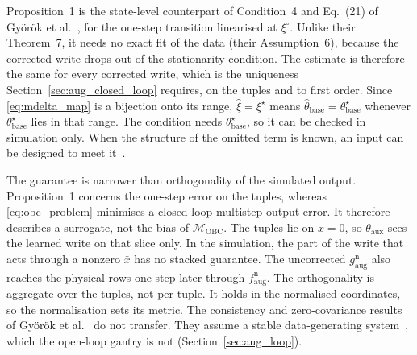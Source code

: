 Proposition~1 is the state-level counterpart of Condition~4 and Eq.~(21) of
Gy\"or\"ok et al.~\cite[Sec.~4.1]{gyorok2026obc}, for the one-step transition
linearised at $\xi^\circ$.
Unlike their Theorem~7, it needs no exact fit of the data (their
Assumption~6), because the corrected write drops out of the stationarity
condition.
The estimate is therefore the same for every corrected write, which is the
uniqueness Section~\ref{sec:aug_closed_loop} requires, on the tuples and to
first order.
Since \eqref{eq:mdelta_map} is a bijection onto its range,
$\hat\xi=\xi^\star$ means $\hat\theta_{\mathrm{base}}=\theta^\star_{\mathrm{base}}$
whenever $\theta^\star_{\mathrm{base}}$ lies in that range.
The condition needs $\theta^\star_{\mathrm{base}}$, so it can be checked in
simulation only.
When the structure of the omitted term is known, an input can be designed to
meet it~\cite[Remark~5]{gyorok2026obc}.

The guarantee is narrower than orthogonality of the simulated output.
Proposition~1 concerns the one-step error on the tuples, whereas
\eqref{eq:obc_problem} minimises a closed-loop multistep output error.
It therefore describes a surrogate, not the bias of $\mathcal M_{\mathrm{OBC}}$.
The tuples lie on $\bar x=0$, so $\theta_{\mathrm{aux}}$ sees the learned write
on that slice only.
In the simulation, the part of the write that acts through a nonzero $\bar x$
has no stacked guarantee.
The uncorrected $g^{\mathrm n}_{\mathrm{aug}}$ also reaches the physical rows
one step later through $f^{\mathrm n}_{\mathrm{aug}}$.
The orthogonality is aggregate over the tuples, not per tuple.
It holds in the normalised coordinates, so the normalisation sets its metric.
The consistency and zero-covariance results of Gy\"or\"ok et
al.~\cite[Thms.~16, 18]{gyorok2026obc} do not transfer.
They assume a stable data-generating
system~\cite[Condition~10]{gyorok2026obc}, which the open-loop gantry is not
(Section~\ref{sec:aug_loop}).
